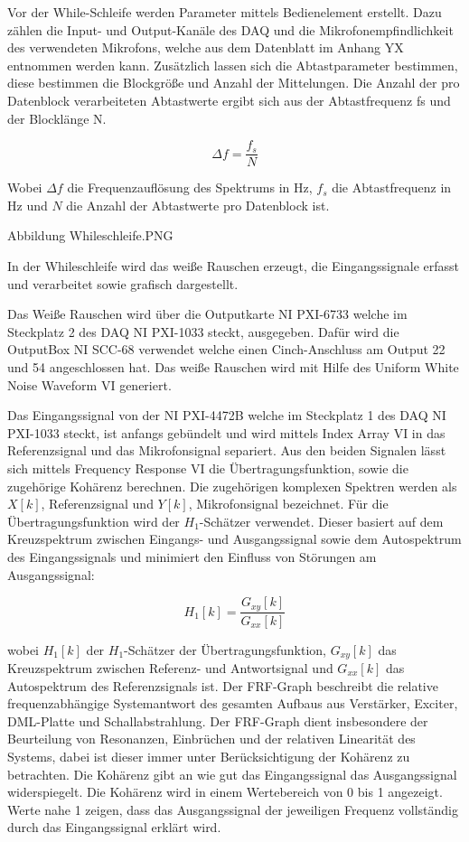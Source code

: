  Vor der While-Schleife werden Parameter mittels Bedienelement erstellt. Dazu zählen die Input- und Output-Kanäle des DAQ und die Mikrofonempfindlichkeit des verwendeten Mikrofons, welche aus dem Datenblatt im Anhang YX entnommen werden kann. Zusätzlich lassen sich die Abtastparameter bestimmen, diese bestimmen die Blockgröße und Anzahl der Mittelungen. Die Anzahl der pro Datenblock verarbeiteten Abtastwerte ergibt sich aus der Abtastfrequenz fs und der Blocklänge N.
 
 \begin{equation}
\Delta f = \frac{f_s}{N}
\end{equation}

Wobei $\Delta f$ die Frequenzauflösung des Spektrums in Hz, $f_s$ die Abtastfrequenz in Hz und $N$ die Anzahl der Abtastwerte pro Datenblock ist. 



Abbildung Whileschleife.PNG


In der Whileschleife wird das weiße Rauschen erzeugt, die Eingangssignale erfasst und verarbeitet sowie grafisch dargestellt. 

Das Weiße Rauschen wird über die Outputkarte NI PXI-6733 welche im Steckplatz 2 des DAQ NI PXI-1033 steckt, ausgegeben. Dafür wird die OutputBox NI SCC-68 verwendet welche einen Cinch-Anschluss am Output 22 und 54 angeschlossen hat. Das weiße Rauschen wird mit Hilfe des Uniform White Noise Waveform VI generiert.

Das Eingangssignal von der NI PXI-4472B welche im Steckplatz 1 des DAQ NI PXI-1033 steckt, ist anfangs gebündelt und wird mittels Index Array VI in das Referenzsignal und das Mikrofonsignal separiert.
Aus den beiden Signalen lässt sich mittels Frequency Response VI die Übertragungsfunktion, sowie die zugehörige Kohärenz berechnen. 
Die zugehörigen komplexen Spektren werden als $X[k]$, Referenzsignal und $Y[k]$, Mikrofonsignal bezeichnet.
Für die Übertragungsfunktion wird der $H_1$-Schätzer verwendet. Dieser basiert auf dem Kreuzspektrum zwischen Eingangs- und Ausgangssignal sowie dem Autospektrum des Eingangssignals und minimiert den Einfluss von Störungen am Ausgangssignal:

\begin{equation}
H_1[k] = \frac{G_{xy}[k]}{G_{xx}[k]}
\end{equation}

wobei $H_1[k]$ der $H_1$-Schätzer der Übertragungsfunktion, $G_{xy}[k]$ das Kreuzspektrum zwischen Referenz- und Antwortsignal und $G_{xx}[k]$ das Autospektrum des Referenzsignals ist.
Der FRF-Graph beschreibt die relative frequenzabhängige Systemantwort des gesamten Aufbaus aus Verstärker, Exciter, DML-Platte und Schallabstrahlung. Der FRF-Graph dient insbesondere der Beurteilung von Resonanzen, Einbrüchen und der relativen Linearität des Systems, dabei ist dieser immer unter Berücksichtigung der Kohärenz zu betrachten. Die Kohärenz gibt an wie gut das Eingangssignal das Ausgangssignal widerspiegelt. Die Kohärenz wird in einem Wertebereich von 0 bis 1 angezeigt. Werte nahe 1 zeigen, dass das Ausgangssignal der jeweiligen Frequenz vollständig durch das Eingangssignal erklärt wird.



